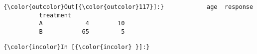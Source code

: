 \documentclass[11pt]{article}
\begin{document}
\begin{Verbatim}[commandchars=\\\{\}]
{\color{outcolor}Out[{\color{outcolor}117}]:}            age  response
          treatment               
          A            4        10
          B           65         5
\end{Verbatim}
            
    \begin{Verbatim}[commandchars=\\\{\}]
{\color{incolor}In [{\color{incolor} }]:} 
\end{Verbatim}


    
    
    
    
\end{document}
